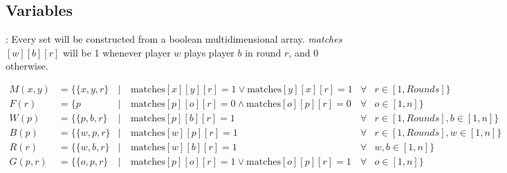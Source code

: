 \documentclass[9pt, aspectratio=169, xcolor=table]{beamer}
\begin{document}
\subsection{Variables}
\begin{frame}{\secname: \subsecname}
    Every set will be constructed from a boolean multidimensional array. \textit{matches}$[w][b][r]$ will be 1 whenever player $w$ plays player $b$ in round $r$, and 0 otherwise.
    \begin{tcolorbox}[colback=gray!30, colframe=Veronablue, arc=0pt, outer arc=0pt, title = \textbf{Set constructions}]
	\begin{align*}
	    M(x, y)   &= \{ \{x, y, r\} &|& \ \text{matches}[x][y][r] = 1 \lor \text{matches}[y][x][r] = 1   &\forall &r \in [1, Rounds]\}\\
	    F(r)      &= \{ p           &|& \ \text{matches}[p][o][r] = 0 \land \text{matches}[o][p][r] = 0  &\forall &o \in [1, n]\}\\
	    W(p)      &= \{ \{p, b, r\} &|& \ \text{matches}[p][b][r] = 1                                    &\forall &r \in [1, Rounds], b \in [1, n]\}\\
	    B(p)      &= \{ \{w, p, r\} &|& \ \text{matches}[w][p][r] = 1                                    &\forall &r \in [1, Rounds], w \in [1, n]\}\\
	    R(r)      &= \{ \{w, b, r\} &|& \ \text{matches}[w][b][r] = 1                                    &\forall &w, b \in [1, n]\}\\
	    G(p, r)   &= \{ \{o, p, r\}           &|& \ \text{matches}[p][o][r] = 1  \lor \text{matches}[o][p][r] = 1  &\forall &o \in [1, n]\}\\
	\end{align*}
    \end{tcolorbox}
\end{frame}
\end{document}
